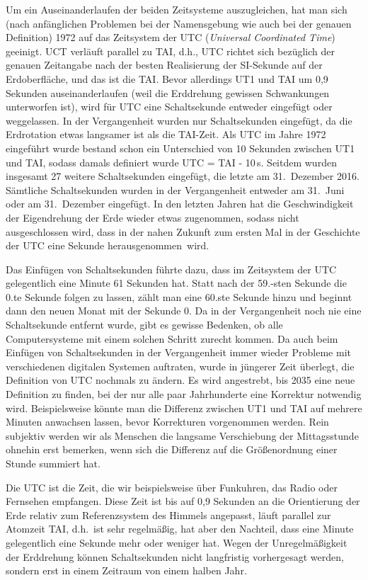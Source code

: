 Um ein Auseinanderlaufen der beiden Zeitsysteme auszugleichen, hat man sich (nach anf\"anglichen Problemen bei
der Namensgebung wie auch bei der genauen Definition) 1972 auf das Zeitsystem 
der UTC
(\textit{Universal Coordinated Time}) geeinigt. UCT verl\"auft parallel zu TAI, d.h., UTC richtet sich bez\"uglich
der genauen Zeitangabe nach der besten Realisierung der SI-Sekunde auf der Erdoberfl\"ache, und das ist
die TAI. Bevor allerdings UT1 und TAI um 0,9 Sekunden auseinanderlaufen (weil die Erddrehung gewissen
Schwankungen unterworfen ist), wird f\"ur UTC eine 
Schaltsekunde entweder eingef\"ugt oder weggelassen.
In der Vergangenheit wurden nur Schaltsekunden eingef\"ugt, da die Erdrotation etwas langsamer ist als
die TAI-Zeit. Als UTC im Jahre 1972 eingef\"uhrt wurde bestand schon ein Unterschied von 10 Sekunden
zwischen UT1 und TAI, sodass damals definiert wurde UTC = TAI - 10\,s. Seitdem wurden insgesamt 27
weitere Schaltsekunden eingef\"ugt, die letzte am 31.\ Dezember 2016. S\"amtliche Schaltsekunden wurden
in der Vergangenheit entweder am 31.\ Juni oder am 31.\ Dezember eingef\"ugt. In den letzten Jahren hat
die Geschwindigkeit der Eigendrehung der Erde wieder etwas zugenommen, sodass nicht ausgeschlossen
wird, dass in der nahen Zukunft zum ersten Mal in der Geschichte der UTC eine Sekunde \glqq herausgenommen\grqq\ wird. 

Das Einf\"ugen von Schaltsekunden f\"uhrte dazu, dass im Zeitsystem der UTC gelegentlich eine Minute
61 Sekunden hat. Statt nach der 59.-sten Sekunde die 0.te Sekunde folgen zu lassen, z\"ahlt man 
eine 60.ste Sekunde hinzu und beginnt dann den neuen Monat mit der Sekunde 0. Da in der Vergangenheit
noch nie eine Schaltsekunde entfernt wurde, gibt es gewisse Bedenken, ob alle Computersysteme mit einem
solchen Schritt zurecht kommen. Da auch beim Einf\"ugen von Schaltsekunden in der Vergangenheit immer
wieder Probleme mit verschiedenen digitalen Systemen auftraten, wurde in j\"ungerer Zeit \"uberlegt, die
Definition von UTC nochmals zu \"andern. Es wird angestrebt, bis 2035 eine neue Definition zu finden, bei
der nur alle paar Jahrhunderte eine Korrektur notwendig wird. Beispielsweise k\"onnte man die Differenz
zwischen UT1 und TAI auf mehrere Minuten anwachsen lassen, bevor Korrekturen vorgenommen werden.
Rein subjektiv werden wir als Menschen die langsame Verschiebung der Mittagsstunde ohnehin erst
bemerken, wenn sich die Differenz auf die Gr\"o\ss enordnung einer Stunde summiert hat. 

Die UTC ist die Zeit, die wir beispielsweise \"uber Funkuhren, das Radio oder Fernsehen empfangen.
Diese Zeit ist bis auf 0,9 Sekunden an die Orientierung der Erde relativ zum Referenzsystem des Himmels
angepasst, l\"auft parallel zur Atomzeit TAI, d.h.\ ist sehr regelm\"a\ss ig, hat aber den Nachteil, 
dass eine Minute gelegentlich eine Sekunde mehr oder weniger hat. Wegen der Unregelm\"a\ss igkeit
der Erddrehung k\"onnen Schaltsekunden nicht langfristig vorhergesagt werden, sondern erst in einem
Zeitraum von einem halben Jahr. 

